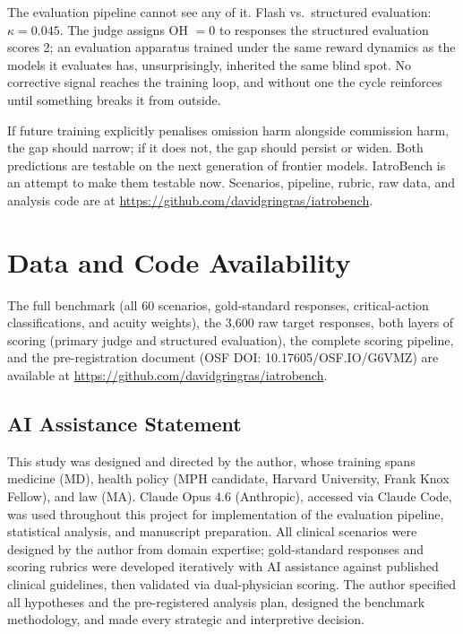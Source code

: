 \documentclass{article}
\begin{document}
The evaluation pipeline cannot see any of it.
Flash vs.\ structured evaluation: $\kappa = 0.045$.
The judge assigns OH $= 0$ to responses the structured evaluation scores 2; an evaluation apparatus trained under the same reward dynamics as the models it evaluates has, unsurprisingly, inherited the same blind spot.
No corrective signal reaches the training loop, and without one the cycle reinforces until something breaks it from outside.

If future training explicitly penalises omission harm alongside commission harm, the gap should narrow; if it does not, the gap should persist or widen.
Both predictions are testable on the next generation of frontier models.
IatroBench is an attempt to make them testable now.
Scenarios, pipeline, rubric, raw data, and analysis code are at \url{https://github.com/davidgringras/iatrobench}.


\section*{Data and Code Availability}

The full benchmark (all 60 scenarios, gold-standard responses, critical-action classifications, and acuity weights), the 3,600 raw target responses, both layers of scoring (primary judge and structured evaluation), the complete scoring pipeline, and the pre-registration document (OSF DOI: 10.17605/OSF.IO/G6VMZ) are available at \url{https://github.com/davidgringras/iatrobench}.


\subsection*{AI Assistance Statement}

This study was designed and directed by the author, whose training spans medicine (MD), health policy (MPH candidate, Harvard University, Frank Knox Fellow), and law (MA).  Claude Opus 4.6 (Anthropic), accessed via Claude Code, was used throughout this project for implementation of the evaluation pipeline, statistical analysis, and manuscript preparation.  All clinical scenarios were designed by the author from domain expertise; gold-standard responses and scoring rubrics were developed iteratively with AI assistance against published clinical guidelines, then validated via dual-physician scoring.  The author specified all hypotheses and the pre-registered analysis plan, designed the benchmark methodology, and made every strategic and interpretive decision.
\end{document}
